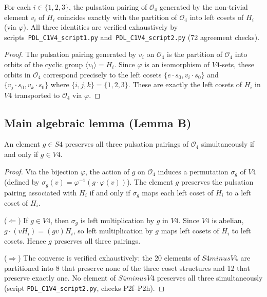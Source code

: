 \documentclass[11pt,a4paper]{article}
\def\Sfour{S4}%
\def\Vfour{V4}%
\def\Kfour{K4}%
\def\setminus{ minus }%
\newenvironment{lemmabox}[1][]{%
  \begin{tcolorbox}[lemmastyle,title={Lemma\ifx\relax#1\relax\else: #1\fi}]}
  {\end{tcolorbox}}
\theoremstyle{plain}
\theoremstyle{definition}
\theoremstyle{remark}
\newcommand{\Kfour}{K_4}
\newcommand{\Sfour}{S_4}
\newcommand{\Vfour}{V_4}
\newcommand{\Orb}[1]{\mathcal{O}_{#1}}
\begin{document}
\begin{lemmabox}[Pulsation pairings equal coset partitions]
\label{lem:cosets}
For each $i \in \{1,2,3\}$, the pulsation pairing of $\Orb{4}$ generated by the
non-trivial element $v_i$ of $H_i$ coincides exactly with the partition of $\Orb{4}$
into left cosets of $H_i$ (via $\varphi$). All three identities are verified exhaustively
by scripts~\texttt{PDL\_C1V4\_script1.py} and~\texttt{PDL\_C1V4\_script2.py}
(72 agreement checks).
\end{lemmabox}

\begin{proof}
The pulsation pairing generated by $v_i$ on $\Orb{4}$ is the partition of $\Orb{4}$ into
orbits of the cyclic group $\langle v_i \rangle = H_i$. Since $\varphi$ is an isomorphism
of $\Vfour$-sets, these orbits in $\Orb{4}$ correspond precisely to the left cosets
$\{e \cdot s_0, v_i \cdot s_0\}$ and $\{v_j \cdot s_0, v_k \cdot s_0\}$ where
$\{i,j,k\} = \{1,2,3\}$. These are exactly the left cosets of $H_i$ in $\Vfour$
transported to $\Orb{4}$ via $\varphi$.
\end{proof}

\subsection{Main algebraic lemma (Lemma B)}

\begin{lemmabox}[$\Vfour$ as the pulsation-symmetry group of $\Kfour$]
\label{lem:B}
An element $g \in \Sfour$ preserves all three pulsation pairings of $\Orb{4}$
simultaneously if and only if $g \in \Vfour$.
\end{lemmabox}

\begin{proof}
Via the bijection $\varphi$, the action of $g$ on $\Orb{4}$ induces a permutation
$\sigma_g$ of $\Vfour$ (defined by $\sigma_g(v) = \varphi^{-1}(g \cdot \varphi(v))$).
The element $g$ preserves the pulsation pairing associated with $H_i$ if and only if
$\sigma_g$ maps each left coset of $H_i$ to a left coset of $H_i$.

($\Leftarrow$) If $g \in \Vfour$, then $\sigma_g$ is left multiplication by $g$ in
$\Vfour$. Since $\Vfour$ is abelian, $g \cdot (v H_i) = (gv) H_i$, so left multiplication
by $g$ maps left cosets of $H_i$ to left cosets. Hence $g$ preserves all three pairings.

($\Rightarrow$) The converse is verified exhaustively: the 20 elements of $\Sfour \setminus \Vfour$
are partitioned into 8 that preserve none of the three coset structures and 12 that preserve
exactly one. No element of $\Sfour \setminus \Vfour$ preserves all three simultaneously
(script \texttt{PDL\_C1V4\_script2.py}, checks P2f--P2h).
\end{proof}
\end{document}
